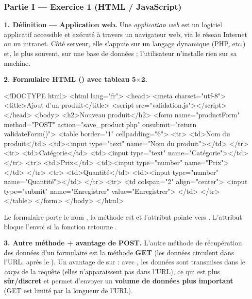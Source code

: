 \subsubsection*{Partie I — Exercice 1 (HTML / JavaScript)}

\textbf{1. Définition — Application web.} Une \emph{application web} est un logiciel
applicatif accessible et exécuté à travers un navigateur web, via le réseau Internet ou un
intranet. Côté serveur, elle s'appuie sur un langage dynamique (PHP, etc.) et, le plus
souvent, sur une base de données ; l'utilisateur n'installe rien sur sa machine.

\medskip
\textbf{2. Formulaire HTML () avec tableau 5$\times$2.}

\begin{codehtml}
<!DOCTYPE html>
<html lang="fr">
<head>
  <meta charset="utf-8">
  <title>Ajout d'un produit</title>
  <script src="validation.js"></script>
</head>
<body>
  <h2>Nouveau produit</h2>
  <form name="productForm" method="POST" action="save_product.php"
        onsubmit="return validateForm()">
    <table border="1" cellpadding="6">
      <tr>
        <td>Nom du produit</td>
        <td><input type="text" name="Nom du produit"></td>
      </tr>
      <tr>
        <td>Catégorie</td>
        <td><input type="text" name="Catégorie"></td>
      </tr>
      <tr>
        <td>Prix</td>
        <td><input type="number" name="Prix"></td>
      </tr>
      <tr>
        <td>Quantité</td>
        <td><input type="number" name="Quantité"></td>
      </tr>
      <tr>
        <td colspan="2" align="center">
          <input type="submit" name="Enregistrer" value="Enregistrer">
        </td>
      </tr>
    </table>
  </form>
</body>
</html>
\end{codehtml}


\begin{remarque}
Le formulaire porte le nom , la méthode est  et l'attribut
 pointe vers . L'attribut  bloque l'envoi si la fonction retourne .
\end{remarque}

\medskip
\textbf{3. Autre méthode + avantage de POST.} L'autre méthode de récupération des données
d'un formulaire est la méthode \textbf{GET} (les données circulent dans l'URL, après le
). Un avantage de  sur  : avec , les données sont
transmises dans le \emph{corps} de la requête (elles n'apparaissent pas dans l'URL), ce qui
est plus \textbf{sûr/discret} et permet d'envoyer un \textbf{volume de données plus
important} (GET est limité par la longueur de l'URL).

